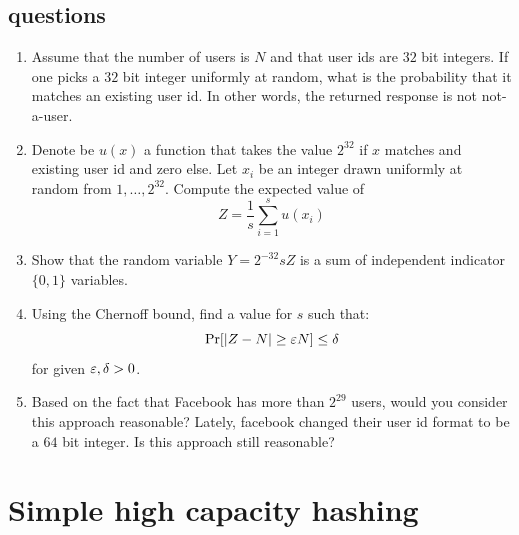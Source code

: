 \documentclass{article}
\begin{document}
\subsection*{questions}
\begin{enumerate}
\item Assume that the number of users is $N$ and that user ids are $32$ bit integers.
If one picks a $32$ bit integer uniformly at random, what is the probability that it matches an existing user id. In other words, the returned response is not not-a-user.
\item Denote be $u(x)$ a function that takes the value $2^{32}$ if $x$ matches and existing user id and zero else.
Let $x_i$ be an integer drawn uniformly at random from $1,\ldots,2^{32}$. Compute the expected value of $$Z = \frac{1}{s}\sum_{i=1}^{s} u(x_i)$$
\item Show that the random variable $Y = 2^{-32}sZ$ is a sum of independent indicator $\{0,1\}$ variables.
\item Using the Chernoff bound, find a value for $s$ such that: $$\Pr[|Z-N| \ge \varepsilon N] \le \delta$$ for given $\varepsilon,\delta >0$.
\item Based on the fact that Facebook has more than $2^{29}$ users, would you consider this approach reasonable?
Lately, facebook changed their user id format to be a $64$ bit integer. Is this approach still reasonable?
\end{enumerate}

\pagebreak


\section{Simple high capacity hashing}
\end{document}
